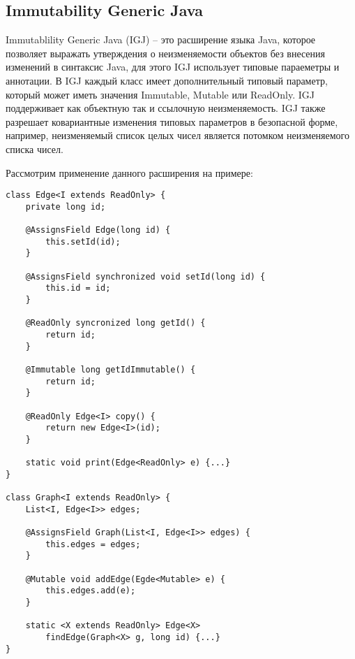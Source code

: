 \subsection{Immutability Generic Java}

Immutablility Generic Java (IGJ) \cite{Zibin2007} -- это расширение языка Java, которое позволяет выражать утверждения о неизменяемости объектов без внесения изменений в синтаксис Java, для этого IGJ использует типовые параеметры и аннотации. В IGJ каждый класс имеет дополнительный типовый параметр, который может иметь значения Immutable, Mutable или ReadOnly. IGJ поддерживает как объектную так и ссылочную неизменяемость. IGJ также разрешает ковариантные изменения типовых параметров в безопасной форме, например, неизменяемый список целых чисел является потомком неизменяемого списка чисел.

Рассмотрим применение данного расширения на примере:

\begin{lstlisting}[caption=Пример использования IGJ, label=code:igj_graph]
class Edge<I extends ReadOnly> {
    private long id;
    
    @AssignsField Edge(long id) {
        this.setId(id);
    }
    
    @AssignsField synchronized void setId(long id) {
        this.id = id;
    }
    
    @ReadOnly syncronized long getId() {
        return id;
    }
    
    @Immutable long getIdImmutable() {
        return id;
    }
    
    @ReadOnly Edge<I> copy() {
        return new Edge<I>(id);
    }
    
    static void print(Edge<ReadOnly> e) {...}
}

class Graph<I extends ReadOnly> {
    List<I, Edge<I>> edges;
    
    @AssignsField Graph(List<I, Edge<I>> edges) {
        this.edges = edges;
    }
    
    @Mutable void addEdge(Egde<Mutable> e) {
        this.edges.add(e);
    }
    
    static <X extends ReadOnly> Edge<X> 
        findEdge(Graph<X> g, long id) {...}
}
\end{lstlisting}

